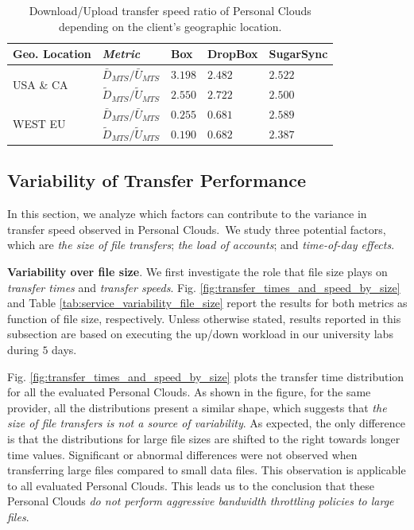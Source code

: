 \begin{table}[h]
\begin{center}
\begin{tabular}{|l|l|l|l|l|}
\hline
 Geo. Location& \textit{Metric} & Box & DropBox & SugarSync \\ \hline
\multirow{2}{*}{USA \& CA}
 & $\bar{D}_{MTS}/\bar{U}_{MTS}$ & $3.198$ & $2.482$ & $2.522$ \\
 & $\tilde{D}_{MTS}/\tilde{U}_{MTS}$ & $2.550$ & $2.722$ & $2.500$ \\ \hline
\multirow{2}{*}{WEST EU}
 & $\bar{D}_{MTS}/\bar{U}_{MTS}$ & $0.255$ & $0.681$ & $2.589$ \\
 & $\tilde{D}_{MTS}/\tilde{U}_{MTS}$ & $0.190$ & $0.682$ & $2.387$ \\ \hline
\end{tabular}
\caption{Download/Upload transfer speed ratio of Personal Clouds depending on the client's geographic location.}
\vspace{-5mm}
\label{tab:down_up_ratio_location}
\end{center}
\end{table}


\subsection{Variability of Transfer Performance}
\label{sec:variability}

In this section, we analyze which factors can contribute to the
variance in transfer speed observed in Personal Clouds.~We
study three potential factors, which are \textit{the size of file transfers};
\textit{the load of accounts}; and \textit{time-of-day effects}.
\medskip

\noindent\textbf{Variability over file size}. We first investigate the role that 
file size plays on \textit{transfer times} 
and \textit{transfer speeds}. Fig. \ref{fig:transfer_times_and_speed_by_size}
and Table \ref{tab:service_variability_file_size} report the results
for both metrics as function of file size, respectively. Unless otherwise
stated, results reported in this subsection are based on executing the 
up/down workload in our university labs during $5$ days.  

Fig. \ref{fig:transfer_times_and_speed_by_size} plots the
transfer time distribution for all the evaluated
Personal Clouds. As shown in the figure, for
the same provider, all the distributions present a similar
shape, which suggests that \textit{the size of file transfers is not a 
source of variability}. As expected, the only difference is that
the distributions for large file sizes are shifted to the right towards
longer time values. Significant or abnormal differences were not observed
when transferring large files compared to small data files. This observation is applicable to all evaluated Personal Clouds. 
This leads us to the conclusion that these Personal Clouds
\textit{do not perform aggressive bandwidth throttling policies to large files}.

